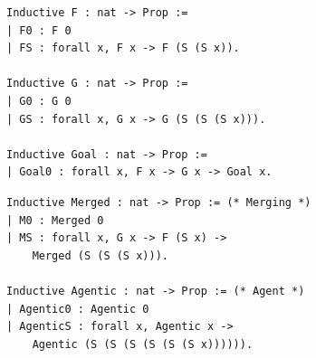 \begingroup
\setlength{\parindent}{0pt}
\begin{examplerow}
\begin{minipage}[t]{0.5\linewidth}
\vspace{0pt}
\begin{lstlisting}[style=reformulationexample,style=examplecolumn]
Inductive F : nat -> Prop :=
| F0 : F 0
| FS : forall x, F x -> F (S (S x)).

Inductive G : nat -> Prop :=
| G0 : G 0
| GS : forall x, G x -> G (S (S (S x))).

Inductive Goal : nat -> Prop :=
| Goal0 : forall x, F x -> G x -> Goal x.
\end{lstlisting}
\end{minipage}%
\begin{minipage}[t]{0.5\linewidth}
\vspace{0pt}
\begin{lstlisting}[style=reformulationexample,style=examplecolumn]
Inductive Merged : nat -> Prop := (* Merging *)
| M0 : Merged 0
| MS : forall x, G x -> F (S x) ->
    Merged (S (S (S x))).

Inductive Agentic : nat -> Prop := (* Agent *)
| Agentic0 : Agentic 0
| AgenticS : forall x, Agentic x ->
    Agentic (S (S (S (S (S (S x)))))).
\end{lstlisting}
\end{minipage}
\end{examplerow}
\endgroup
